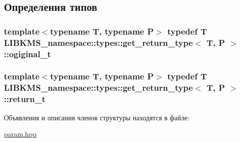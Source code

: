 \subsection{Определения типов}
\hypertarget{structLIBKMS__namespace_1_1types_1_1get__return__type_a599165be1e050dd76942eb69e5a24319}{
\subsubsection[{ogiginal\-\_\-t}]{\setlength{\rightskip}{0pt plus 5cm}template$<$typename T, typename P$>$ typedef T {\bf L\-I\-B\-K\-M\-S\-\_\-namespace\-::types\-::get\-\_\-return\-\_\-type}$<$ T, P $>$\-::{\bf ogiginal\-\_\-t}}}\label{structLIBKMS__namespace_1_1types_1_1get__return__type_a599165be1e050dd76942eb69e5a24319}
\hypertarget{structLIBKMS__namespace_1_1types_1_1get__return__type_ac549f484335955f84d86be6a644198e2}{
\subsubsection[{return\-\_\-t}]{\setlength{\rightskip}{0pt plus 5cm}template$<$typename T, typename P$>$ typedef T {\bf L\-I\-B\-K\-M\-S\-\_\-namespace\-::types\-::get\-\_\-return\-\_\-type}$<$ T, P $>$\-::{\bf return\-\_\-t}}}\label{structLIBKMS__namespace_1_1types_1_1get__return__type_ac549f484335955f84d86be6a644198e2}


Объявления и описания членов структуры находятся в файле\-:\begin{DoxyCompactItemize}
\item 
\hyperlink{param_8hpp}{param.\-hpp}\end{DoxyCompactItemize}
